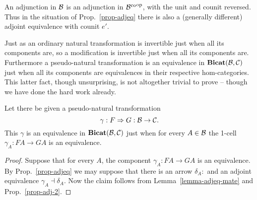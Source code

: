 \begin{remark} %
	An adjunction in $\mathcal{B}$ is an adjunction in ${\mathcal{B}^\mathrm{co}}^\mathrm{op}$, with the
	unit and counit reversed. Thus in the situation of Prop.~\ref{prop-adjeq}
	there is also a (generally different) adjoint equivalence with counit $e'$.
\end{remark}
Just as an ordinary natural transformation is invertible just when all its
components are, so a modification is invertible just when all its components
are. Furthermore a pseudo-natural transformation is an equivalence
in $\mathbf{Bicat}(\mathcal{B},\mathcal{C})$ just when all its components are equivalences in
their respective hom-categories. This latter fact, though unsurprising,
is not altogether trivial to prove -- though we have done the hard work
already.
\begin{propn}\label{prop-pneq}
	Let there be given a pseudo-natural transformation
	\[
		\gamma: F\Rightarrow G: \mathcal{B}\to\mathcal{C}.
	\]
	This $\gamma$ is an equivalence in $\mathbf{Bicat}(\mathcal{B},\mathcal{C})$ just
	when for every $A\in\mathcal{B}$ the 1-cell $\gamma_A: FA\to GA$
	is an equivalence.
\end{propn}
\begin{proof}
	Suppose that for every $A$, the component $\gamma_A: FA\to GA$
	is an equivalence. By Prop.~\ref{prop-adjeq} we may suppose that
	there is an arrow $\delta_A: $ and an adjoint equivalence
	$\gamma_A\dashv\delta_A$. Now the claim follows from
	Lemma~\ref{lemma-adjeq-mate} and Prop.~\ref{prop-adj-2}.
\end{proof}

